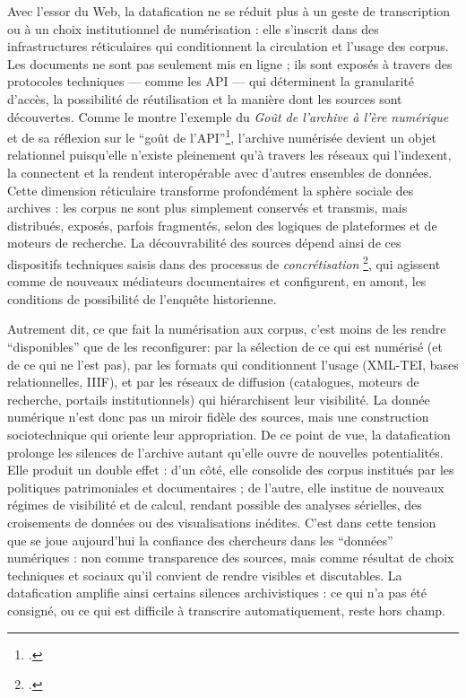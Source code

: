 Avec l’essor du Web, la datafication ne se réduit plus à un geste de transcription ou à un choix institutionnel de numérisation : elle s’inscrit dans des infrastructures réticulaires qui conditionnent la circulation et l’usage des corpus. Les documents ne sont pas seulement mis en ligne ; ils sont exposés à travers des protocoles techniques — comme les API — qui déterminent la granularité d’accès, la possibilité de réutilisation et la manière dont les sources sont découvertes. Comme le montre l’exemple du \emph{Goût de l’archive à l’ère numérique} et de sa réflexion sur le \enquote{goût de l’API}\footcite[][]{goutapi}, l’archive numérisée devient un objet relationnel puisqu'elle n’existe pleinement qu’à travers les réseaux qui l’indexent, la connectent et la rendent interopérable avec d’autres ensembles de données. Cette dimension réticulaire transforme profondément la sphère sociale des archives : les corpus ne sont plus simplement conservés et transmis, mais distribués, exposés, parfois fragmentés, selon des logiques de plateformes et de moteurs de recherche. La découvrabilité des sources dépend ainsi de ces dispositifs techniques saisis dans des processus de \emph{concrétisation} \footcite[][]{meot}, qui agissent comme de nouveaux médiateurs documentaires et configurent, en amont, les conditions de possibilité de l’enquête historienne. 

Autrement dit, ce que fait la numérisation aux corpus, c’est moins de les rendre \enquote{disponibles} que de les reconfigurer: par la sélection de ce qui est numérisé (et de ce qui ne l’est pas), par les formats qui conditionnent l’usage (XML-TEI, bases relationnelles, IIIF), et par les réseaux de diffusion (catalogues, moteurs de recherche, portails institutionnels) qui hiérarchisent leur visibilité. La donnée numérique n’est donc pas un miroir fidèle des sources, mais une construction sociotechnique qui oriente leur appropriation. De ce point de vue, la datafication prolonge les silences de l’archive autant qu’elle ouvre de nouvelles potentialités. Elle produit un double effet : d’un côté, elle consolide des corpus institués par les politiques patrimoniales et documentaires ; de l’autre, elle institue de nouveaux régimes de visibilité et de calcul, rendant possible des analyses sérielles, des croisements de données ou des visualisations inédites. C’est dans cette tension que se joue aujourd’hui la confiance des chercheurs dans les \enquote{données} numériques : non comme transparence des sources, mais comme résultat de choix techniques et sociaux qu’il convient de rendre visibles et discutables. La datafication amplifie ainsi certains silences archivistiques : ce qui n’a pas été consigné, ou ce qui est difficile à transcrire automatiquement, reste hors champ.

